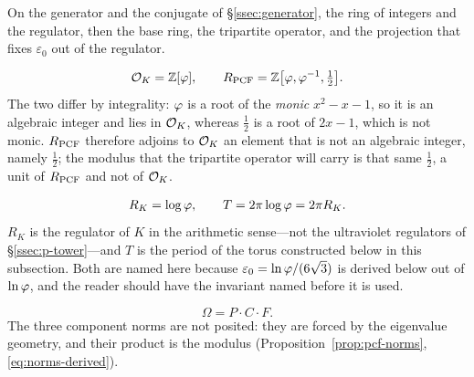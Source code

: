 On the generator and the conjugate of \S\ref{ssec:generator}, the ring of integers and the
regulator, then the base ring, the tripartite operator, and the projection that fixes
$\varepsilon_0$ out of the regulator.
\begin{proposition}\label{prop:rings}
\begin{equation}\label{eq:OK-vs-Rpcf}
  \mathcal{O}_K=\mathbb{Z}[\varphi],
  \qquad
  R_{\mathrm{PCF}}=\mathbb{Z}\bigl[\varphi,\varphi^{-1},\tfrac12\bigr] .
\end{equation}
The two differ by integrality: $\varphi$ is a root of the \emph{monic} $x^{2}-x-1$, so it is an
algebraic integer and lies in $\mathcal{O}_K$, whereas $\tfrac12$ is a root of $2x-1$, which is not monic.
$R_{\mathrm{PCF}}$ therefore adjoins to $\mathcal{O}_K$ an element that is not an algebraic integer, namely
$\tfrac12$; the modulus that the tripartite operator will carry is that same $\tfrac12$, a unit
of $R_{\mathrm{PCF}}$ and not of $\mathcal{O}_K$.


\end{proposition}

\begin{definition}\label{def:regulator}
\begin{equation}\label{eq:regulator}
  R_K=\log\varphi,
  \qquad
  T=2\pi\log\varphi=2\pi R_K .
\end{equation}
$R_K$ is the regulator of $K$ in the arithmetic sense---not the ultraviolet regulators of
\S\ref{ssec:p-tower}---and $T$ is the period of the torus constructed below in this subsection.
Both are named here
because $\varepsilon_0=\ln\varphi/(6\sqrt3)$ is derived below out of $\ln\varphi$, and the reader
should have the invariant named before it is used.


\end{definition}

\begin{equation}\label{eq:omega-norms}
\Omega=P\cdot C\cdot F .
\end{equation}
The three component norms are not posited: they are forced by the eigenvalue geometry, and their
product is the modulus (Proposition~\ref{prop:pcf-norms}, \eqref{eq:norms-derived}).

